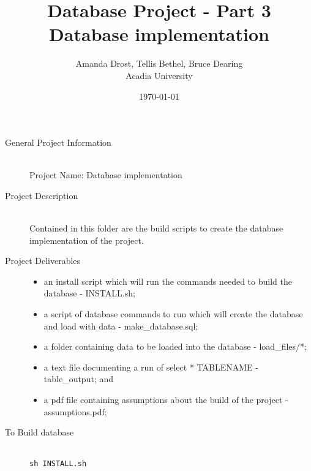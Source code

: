 \documentclass{article}
\begin{document}
\title{\huge{Database Project - Part 3 Database implementation}}
    \author{Amanda Drost, Tellis Bethel, Bruce Dearing\\
    Acadia University}
\date{\today}
\maketitle
\clearpage

\begin{description}

    \item[General Project Information] \hfill \\
        Project Name: Database implementation \\


    \item[Project Description] \hfill \\
        Contained in this folder are the build scripts to create the database implementation of the project.

    
    \item[Project Deliverables] \hfill 
        \begin{itemize}
            \item an install script which will run the commands needed to build the database - INSTALL.sh;
            \item a script of database commands to run which will create the database and load with data - make_database.sql;
            \item a folder containing data to be loaded into the database - load_files/*;
            \item a text file documenting a run of select * TABLENAME - table_output; and
            \item a pdf file containing assumptions about the build of the project - assumptions.pdf;
        \end{itemize}
        
    \item[To Build database] \hfill \\
		\texttt{sh INSTALL.sh}

\end{description}
\end{document}
